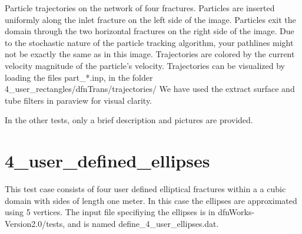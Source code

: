 \documentclass[letterpaper,10pt,english]{sphinxmanual}
\begin{document}
{\hfill{}\hfill}

Particle trajectories on the network of four fractures.
Particles are inserted uniformly along the inlet fracture on the left side of the image.
Particles exit the domain through the two horizontal fractures on the right side of the image.
Due to the stochastic nature of the particle tracking algorithm, your pathlines might not be exactly the same as in this image.
Trajectories are colored by the current velocity magnitude of the particle's velocity.
Trajectories can be visualized by loading the files part\_*.inp, in the folder 4\_user\_rectangles/dfnTrans/trajectories/
We have used the extract surface and tube filters in paraview for visual clarity.

{\hfill{}\hfill}

In the other tests, only a brief description and pictures are provided.


\section{4\_user\_defined\_ellipses}
\label{tutorial:user-defined-ellipses}
This test case consists of four user defined elliptical fractures within a a cubic domain with sides of length one meter. In this case the ellipses are approximated using 5 vertices. The input file specifiying the ellipses is in dfnWorks-Version2.0/tests, and is named define\_4\_user\_ellipses.dat.
\end{document}
